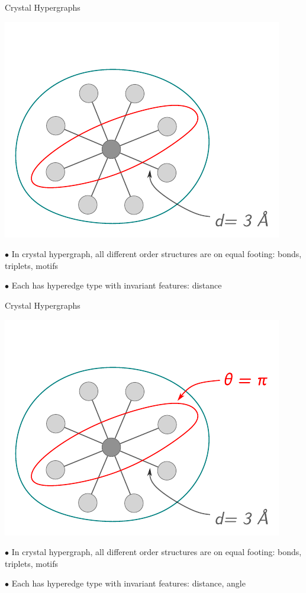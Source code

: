 \documentclass[11pt]{beamer}
\begin{document}
\begin{frame}{Crystal Hypergraphs}


\begin{center}
\includegraphics[scale=0.7]{hypergraph_4.pdf}
\end{center}
\vspace{.5cm}

\medskip

$\bullet$ In crystal hypergraph, all different order structures are on equal footing: bonds, triplets, motifs

\medskip

$\bullet$ Each has hyperedge type with invariant features: distance
\end{frame}

\begin{frame}{Crystal Hypergraphs}

\begin{center}
\includegraphics[scale=0.7]{hypergraph_5.pdf}
\end{center}
\vspace{.5cm}

\medskip

$\bullet$ In crystal hypergraph, all different order structures are on equal footing: bonds, triplets, motifs

\medskip

$\bullet$ Each has hyperedge type with invariant features: distance, angle
\end{frame}
\end{document}
